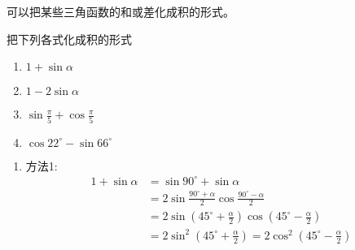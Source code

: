 可以把某些三角函数的和或差化成积的形式。


\begin{example}
    把下列各式化成积的形式
\begin{multicols}{2}
\begin{enumerate}
    \item $1+\sin\alpha$
    \item $1-2\sin\alpha$
    \item $\sin\frac{\pi}{5}+\cos\frac{\pi}{5}$
    \item $\cos22^{\circ}-\sin 66^{\circ}$
\end{enumerate}
\end{multicols}
\end{example}

\begin{solution}
\begin{enumerate}
    \item 方法1: 
\[\begin{split}
    1+\sin\alpha&=\sin90^{\circ}+\sin\alpha\\
    &=2\sin\frac{90^{\circ}+\alpha}{2}\cos\frac{90^{\circ}-\alpha}{2}\\
    &=2\sin\left(45^{\circ}+\frac{\alpha}{2}\right)\cos\left(45^{\circ}-\frac{\alpha}{2}\right)\\
    &=2\sin^2\left(45^{\circ}+\frac{\alpha}{2}\right)=2\cos^2\left(45^{\circ}-\frac{\alpha}{2}\right)
\end{split}\]


\end{enumerate}
\end{solution}
